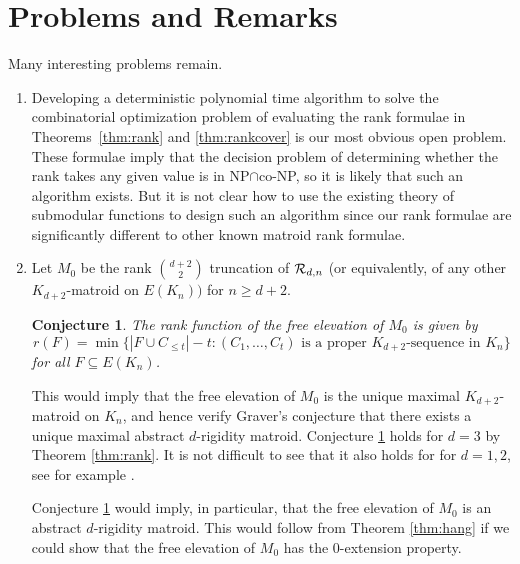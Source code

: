 \documentclass{daj}
\newtheorem{conjecture}[thm]{Conjecture}\theoremstyle{plain}
\begin{document}
\section{Problems and Remarks}\label{sec:close}


Many interesting problems remain.
\begin{enumerate}
\item Developing a deterministic polynomial time algorithm to solve the combinatorial optimization problem of evaluating  the rank formulae in Theorems~\ref{thm:rank} and \ref{thm:rankcover} is our most obvious
open problem.
These formulae imply that the decision problem of determining whether the rank takes any given value is in NP$\cap$co-NP, so it is likely that 
such an algorithm exists.
But it is not clear
how to use the existing theory of submodular functions to design such an algorithm since our rank formulae 
are significantly different to other known matroid rank formulae.


\item  Let $M_0$ be the rank ${{d+2}\choose{2}}$ truncation of ${\cal R}_{d,n}$ (or equivalently, of any other $K_{d+2}$-matroid on $E(K_n))$ for $n\geq d+2$. 

\begin{conjecture}\label{con:K_d+2}
The rank function of the free elevation of $M_0$ is given by
\[
r(F)=\min\{|F\cup C_{\leq t}|-t: (C_1,\dots, C_t) \text{ is a proper $K_{d+2}$-sequence in $K_n$} \}
\]
for all $F\subseteq E(K_n)$.
\end{conjecture} 
This would imply that the free elevation of $M_0$ is the unique maximal $K_{d+2}$-matroid on $K_n$, and hence verify
Graver's conjecture that there exists a unique maximal abstract $d$-rigidity matroid.   Conjecture  \ref{con:K_d+2} holds for $d=3$ by Theorem \ref{thm:rank}. It is not difficult to see that it also holds for for $d=1,2$, see for example  \cite{JT}.

Conjecture  \ref{con:K_d+2} would imply, in particular, that
the free elevation of $M_0$ is an abstract $d$-rigidity matroid. This would follow from Theorem \ref{thm:hang} if we could show that the free elevation of $M_0$ has the 0-extension property.
%
%
%


\end{enumerate}
\end{document}
